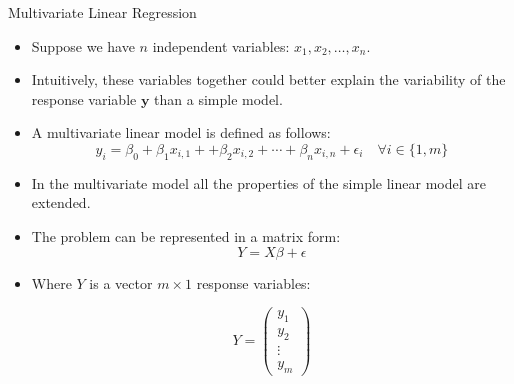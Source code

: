 \documentclass[handout]{beamer}
\begin{document}
\begin{frame}{Multivariate Linear Regression}
\scriptsize{
\begin{itemize}
 \item Suppose we have $n$ independent variables:  $x_1,x_2,\dots,x_n$.
 \item Intuitively, these variables together could better explain the variability of the response variable $\mathbf{y}$ than a simple model.
 \item A multivariate linear model is defined as follows:
 \begin{displaymath}
 y_i=\beta_{0}+\beta_{1}x_{i,1}+ +\beta_{2}x_{i,2} + \cdots + \beta_{n}x_{i,n} +  \epsilon_i \quad \forall i \in \{1,m\}
\end{displaymath}
\item  In the multivariate model all the properties of the simple linear model are extended.

\item The problem can be represented in a matrix form:
\begin{displaymath}
 Y=X\beta+\epsilon
\end{displaymath}

\item Where $Y$ is a vector $m\times 1$ response variables:

\begin{displaymath}
 Y =
 \begin{pmatrix}
  y_{1} \\
  y_{2}  \\
  \vdots  \\
  y_{m}
 \end{pmatrix}
\end{displaymath}






\end{itemize}
 

}
\end{frame}
\end{document}
